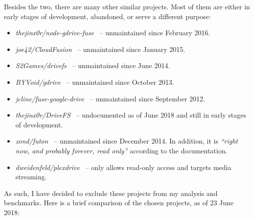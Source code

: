 Besides the two, there are many other similar projects. Most of them are either in early stages of development, abandoned, or serve a different purpose:

\begin{itemize}
  \itemsep0em
  \item \emph{thejinx0r/node-gdrive-fuse}~\cite{thejinx0r/node-gdrive-fuse} -- unmaintained since February 2016.
  \item \emph{joe42/CloudFusion}~\cite{joe42/CloudFusion} -- unmaintained since January 2015.
  \item \emph{S2Games/drivefs}~\cite{S2Games/drivefs} -- unmaintained since June 2014.
  \item \emph{BYVoid/gdrive}~\cite{BYVoid/gdrive} -- unmaintained since October 2013.
  \item \emph{jcline/fuse-google-drive}~\cite{jcline/fuse-google-drive} -- unmaintained since September 2012.
  \item \emph{thejinx0r/DriveFS}~\cite{thejinx0r/DriveFS} -- undocumented as of June 2018 and still in early stages of development.
  \item \emph{zond/futon}~\cite{zond/futon} -- unmaintained since December 2014. In addition, it is \emph{``right now, and probably forever, read only''} according to the documentation.
  \item \emph{dweidenfeld/plexdrive}~\cite{dweidenfeld/plexdrive} -- only allows read-only access and targets media streaming.
\end{itemize}

As such, I have decided to exclude these projects from my analysis and benchmarks. Here is a brief comparison of the chosen projects, as of 23 June 2018:

\vspace{1em}

